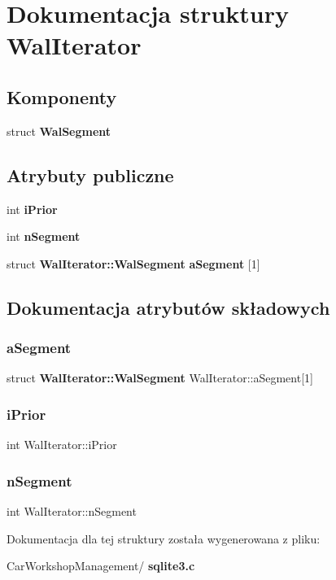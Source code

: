 \section{Dokumentacja struktury Wal\+Iterator}
\label{struct_wal_iterator}
\subsection*{Komponenty}
\begin{DoxyCompactItemize}
\item 
struct \textbf{ Wal\+Segment}
\end{DoxyCompactItemize}
\subsection*{Atrybuty publiczne}
\begin{DoxyCompactItemize}
\item 
int \textbf{ i\+Prior}
\item 
int \textbf{ n\+Segment}
\item 
struct \textbf{ Wal\+Iterator\+::\+Wal\+Segment} \textbf{ a\+Segment} [1]
\end{DoxyCompactItemize}


\subsection{Dokumentacja atrybutów składowych}
\mbox{\label{struct_wal_iterator_a6d3fcaaeeca5a0eee46f9fa7c3cb669b}} 
\subsubsection{aSegment}
{\footnotesize\ttfamily struct \textbf{ Wal\+Iterator\+::\+Wal\+Segment}  Wal\+Iterator\+::a\+Segment[1]}

\mbox{\label{struct_wal_iterator_a2f906125490dd3e967fc53768b03abbb}} 
\subsubsection{iPrior}
{\footnotesize\ttfamily int Wal\+Iterator\+::i\+Prior}

\mbox{\label{struct_wal_iterator_ad81bc9447d6043212289d127dc9fdafa}} 
\subsubsection{nSegment}
{\footnotesize\ttfamily int Wal\+Iterator\+::n\+Segment}



Dokumentacja dla tej struktury została wygenerowana z pliku\+:\begin{DoxyCompactItemize}
\item 
Car\+Workshop\+Management/\textbf{ sqlite3.\+c}\end{DoxyCompactItemize}
